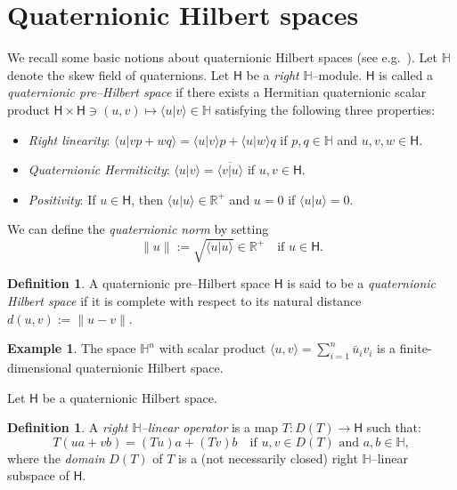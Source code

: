 \documentclass{birkmult}
\theoremstyle{definition}
\newtheorem{definition}[theorem]{Definition}
\newtheorem{example}[theorem]{Example}
\theoremstyle{remark}
\numberwithin{equation}{section}
\begin{document}
\section{Quaternionic Hilbert spaces}\label{HilbertSpaces}
    We recall some basic notions about quaternionic Hilbert spaces (see e.g.~\cite{BDS}). Let ${{\mathbb H}}$ denote the skew field of quaternions.
    Let ${\mathsf{H}}$ be a \emph{right} ${{\mathbb H}}$--module. ${\mathsf{H}}$ is called a \emph{quaternionic pre--Hilbert space} if there exists a Hermitian quaternionic scalar product ${\mathsf{H}}\times{\mathsf{H}}\ni (u,v)\mapsto {\langle} u|v {\rangle} \in {{\mathbb H}}$ satisfying the following three properties:
    \begin{itemize}
        \item \emph{Right linearity}: ${\langle} u| vp +  wq {\rangle} = {\langle} u | v{\rangle} p + {\langle} u | w{\rangle} q$ if $p,q \in {{\mathbb H}}$ and $u,v,w \in {\mathsf{H}}$.
        \item\emph{Quaternionic Hermiticity}: ${\langle} u|v {\rangle} = \overline{{\langle} v | u {\rangle}}$ if $u,v \in {\mathsf{H}}$.
        \item \emph{Positivity}: If $u \in {\mathsf{H}}$, then ${\langle} u| u {\rangle} \in {{\mathbb R}}^+$ and $u=0$ if ${\langle} u | u {\rangle}=0$.
    \end{itemize}
    We can define the \emph{quaternionic norm}  by setting
    \[
    \|u\| := \sqrt{\langle u| u\rangle}\in{{\mathbb R}}^+ \quad \text{if $u \in {\mathsf{H}}$}. 
    \]
    
    
    \begin{definition}
        A quaternionic pre--Hilbert space ${\mathsf{H}}$ is said to be a \emph{quaternionic Hilbert space} if it is complete with respect to its natural distance $d(u,v):=\|u-v\|$.
    \end{definition}
    
    \begin{example} The space ${{\mathbb H}}^n$ with scalar product ${\langle} u,v{\rangle}=\sum_{i=1}^n \bar u_i v_i$ is a finite-dimensional quaternionic Hilbert space.\end{example}

Let ${\mathsf{H}}$ be a quaternionic Hilbert space.
    \begin{definition}
        A \emph{right ${{\mathbb H}}$--linear operator} is a map $T: D(T) {\longrightarrow} {\mathsf{H}}$ such that:
        \[
        T(ua+vb)=(Tu)a+(Tv)b \quad \text{if }u,v \in D(T) \text{ and }a,b \in {{\mathbb H}},
        \]
        where the \emph{domain} $D(T)$ of $T$ is a (not necessarily closed) right ${{\mathbb H}}$--linear subspace of ${\mathsf{H}}$. 
    \end{definition}
\end{document}
